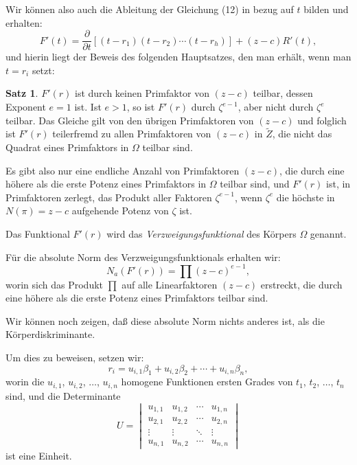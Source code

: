 \documentclass[12pt,a4paper]{article}
\theoremstyle{definition}
\newtheorem{satz}{Satz}[section]
\begin{document}
Wir können also auch die Ableitung der Gleichung (12) in bezug auf $t$ bilden und erhalten:
\[F'(t) = \frac{\partial}{\partial t}[(t - r_1)(t - r_2)\cdots(t - r_h)] + (z - c)R'(t),\]
und hierin liegt der Beweis des folgenden Hauptsatzes, den man erhält, wenn man $t = r_i$ setzt:

\begin{satz}
$F'(r)$ ist durch keinen Primfaktor von $(z - c)$ teilbar, dessen Exponent $e = 1$ ist. Ist $e > 1$, so ist $F'(r)$ durch $\zeta^{e-1}$, aber nicht durch $\zeta^e$ teilbar. Das Gleiche gilt von den übrigen Primfaktoren von $(z - c)$ und folglich ist $F'(r)$ teilerfremd zu allen Primfaktoren von $(z - c)$ in $\tilde{Z}$, die nicht das Quadrat eines Primfaktors in $\Omega$ teilbar sind.
\end{satz}

Es gibt also nur eine endliche Anzahl von Primfaktoren $(z - c)$, die durch eine höhere als die erste Potenz eines Primfaktors in $\Omega$ teilbar sind, und $F'(r)$ ist, in Primfaktoren zerlegt, das Produkt aller Faktoren $\zeta^{e-1}$, wenn $\zeta^e$ die höchste in $N(\pi) = z - c$ aufgehende Potenz von $\zeta$ ist.

Das Funktional $F'(r)$ wird das \emph{Verzweigungsfunktional} des Körpers $\Omega$ genannt.

Für die absolute Norm des Verzweigungsfunktionals erhalten wir:
\begin{equation}
N_a(F'(r)) = \prod (z - c)^{e-1},
\end{equation}
worin sich das Produkt $\prod$ auf alle Linearfaktoren $(z - c)$ erstreckt, die durch eine höhere als die erste Potenz eines Primfaktors teilbar sind.

Wir können noch zeigen, daß diese absolute Norm nichts anderes ist, als die Körperdiskriminante.

Um dies zu beweisen, setzen wir:
\begin{equation}
r_i = u_{i,1}\beta_1 + u_{i,2}\beta_2 + \cdots + u_{i,n}\beta_n,
\end{equation}
worin die $u_{i,1}$, $u_{i,2}$, $\ldots$, $u_{i,n}$ homogene Funktionen ersten Grades von $t_1$, $t_2$, $\ldots$, $t_n$ sind, und die Determinante
\begin{equation}
U = \begin{vmatrix}
u_{1,1} & u_{1,2} & \cdots & u_{1,n} \\
u_{2,1} & u_{2,2} & \cdots & u_{2,n} \\
\vdots & \vdots & \ddots & \vdots \\
u_{n,1} & u_{n,2} & \cdots & u_{n,n}
\end{vmatrix}
\end{equation}
ist eine Einheit.
\end{document}
